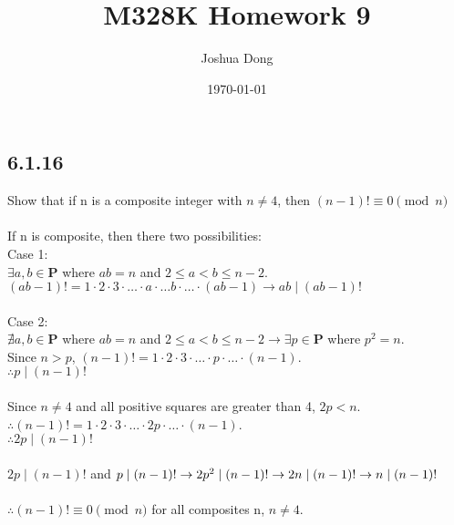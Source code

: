 \documentclass{article}
\begin{document}
\title{M328K\: Homework 9}
\author{Joshua Dong}
\date{\today}
\maketitle

\subsection{6.1.16}
Show that if n is a composite integer with $n \neq 4$,
then $(n-1)! \equiv 0 \pmod{n}$
\\
\\If n is composite, then there two possibilities:
\\Case 1:
\\$\exists a,b \in \textbf{P}$ where $ab = n$ 
and $2 \le a < b \le n-2$.
\\$(ab-1)! =
1\cdot2\cdot3\cdot\ldots\cdot a \cdot\ldots b \cdot\ldots\cdot (ab-1)
\rightarrow ab \mid (ab-1)!$
\\
\\Case 2:
\\$\nexists a,b \in \textbf{P}$ where $ab = n$ and $2 \le a < b \le n-2
\rightarrow \exists p \in \textbf{P}$ where $p^2 = n$.
\\Since $n>p$, $(n-1)! =
1\cdot2\cdot3\cdot\ldots\cdot p \cdot\ldots\cdot (n-1)$.
\\$\therefore p \mid (n-1)!$
\\
\\Since $n \neq 4$ and all positive squares are greater than 4, $2p < n$.
\\$\therefore (n-1)! =
1\cdot2\cdot3\cdot\ldots\cdot 2p \cdot\ldots\cdot (n-1)$.
\\$\therefore 2p \mid (n-1)!$
\\
\\$2p \mid (n-1)!$ and $p \mid (n-1)! \rightarrow
\\2p^2 \mid (n-1)! \rightarrow
\\2n \mid (n-1)! \rightarrow
\\n \mid (n-1)!$
\\
\\$\therefore (n-1)! \equiv 0 \pmod{n}$ for all composites n, $n\neq4$.
\end{document}
